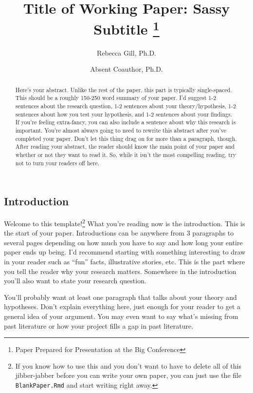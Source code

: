 \documentclass[12pt]{article}
\title{Title of Working Paper: Sassy Subtitle%
  \thanks{Paper Prepared for Presentation at the Big Conference}}
\author[1]{Rebecca Gill, Ph.D.}
\affil{University of Nevada Las Vegas \thanks{\href{mailto:rebecca.gill@unlv.edu}{\nolinkurl{rebecca.gill@unlv.edu}}}}
\author[2]{Absent Coauthor, Ph.D.}
\affil{Add another of these \thanks{\href{mailto:for.more@authors.co}{\nolinkurl{for.more@authors.co}}}}
\begin{document}

\setcounter{page}{0}
\maketitle
\begin{abstract}
\noindent Here's your abstract. Unlike the rest of the paper, this part is typically single-spaced. This should be a roughly 150-250 word summary of your paper. I'd suggest 1-2 sentences about the research question, 1-2 sentences about your theory/hypothesis, 1-2 sentences about how you test your hypothesis, and 1-2 sentences about your findings. If you're feeling extra-fancy, you can also include a sentence about why this research is important. You're almost always going to need to rewrite this abstract after you've completed your paper. Don't let this thing drag on for more than a paragraph, though. After reading your abstract, the reader should know the main point of your paper and whether or not they want to read it. So, while it isn't the most compelling reading, try not to turn your readers off here.
\end{abstract}
\thispagestyle{empty}


\clearpage
\doublespacing

\hypertarget{introduction}{%
\subsection{Introduction}\label{introduction}}

Welcome to this template!\footnote{If you know how to use this and you don't want to have to delete all of this jibber-jabber before you can write your own paper, you can just use the file \texttt{BlankPaper.Rmd} and start writing right away.} What you're reading now is the introduction. This is the start of your paper. Introductions can be anywhere from 3 paragraphs to several pages depending on how much you have to say and how long your entire paper ends up being. I'd recommend starting with something interesting to draw in your reader such as ``fun'' facts, illustrative stories, etc. This is the part where you tell the reader why your research matters. Somewhere in the introduction you'll also want to state your research question.

You'll probably want at least one paragraph that talks about your theory and hypotheses. Don't explain everything here, just enough for your reader to get a general idea of your argument. You may even want to say what's missing from past literature or how your project fills a gap in past literature.
\end{document}
